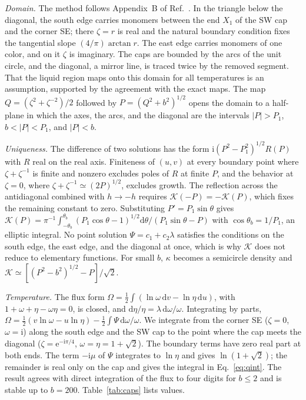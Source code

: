 \documentclass[reprint,aps,prb,floatfix,longbibliography,amsmath,amssymb]{revtex4-2}
\newcommand{\dd}{\mathrm{d}}
\newcommand{\ii}{\mathrm{i}}
\newcommand{\ee}{\mathrm{e}}
\newcommand{\cK}{\mathcal{K}}
\newcommand{\lnt}{\ln(1+\sqrt2)}
\begin{document}
\emph{Domain.} The method follows Appendix~B of Ref.~\cite{WonVacancies}. In the triangle below the diagonal, the south edge carries monomers between the end $X_1$ of the SW cap and the corner SE; there $\zeta=r$ is real and the natural boundary condition fixes the tangential slope $(4/\pi)\arctan r$. The east edge carries monomers of one color, and on it $\zeta$ is imaginary. The caps are bounded by the arcs of the unit circle, and the diagonal, a mirror line, is traced twice by the removed segment. That the liquid region maps onto this domain for all temperatures is an assumption, supported by the agreement with the exact maps. The map $Q=(\zeta^2+\zeta^{-2})/2$ followed by $P=(Q^2+b^2)^{1/2}$ opens the domain to a half-plane in which the axes, the arcs, and the diagonal are the intervals $|P|>P_1$, $b<|P|<P_1$, and $|P|<b$.

\emph{Uniqueness.} The difference of two solutions has the form $\ii(P^2-P_1^2)^{1/2}R(P)$ with $R$ real on the real axis. Finiteness of $(u,v)$ at every boundary point where $\zeta+\zeta^{-1}$ is finite and nonzero excludes poles of $R$ at finite $P$, and the behavior at $\zeta=0$, where $\zeta+\zeta^{-1}\simeq(2P)^{1/2}$, excludes growth. The reflection across the antidiagonal combined with $h\to-h$ requires $\cK(-P)=-\cK(P)$, which fixes the remaining constant to zero. Substituting $P'=P_1\sin\theta$ gives $\cK(P)=\pi^{-1}\int_{-\theta_b}^{\theta_b}(P_1\cos\theta-1)^{1/2}\dd\theta/(P_1\sin\theta-P)$ with $\cos\theta_b=1/P_1$, an elliptic integral. No point solution $\Psi=c_1+c_2\lambda$ satisfies the conditions on the south edge, the east edge, and the diagonal at once, which is why $\cK$ does not reduce to elementary functions. For small $b$, $\kappa$ becomes a semicircle density and $\cK\simeq[(P^2-b^2)^{1/2}-P]/\sqrt2$.

\emph{Temperature.} The flux form $\Omega=\frac12\int(\ln\omega\,\dd v-\ln\eta\,\dd u)$, with $1+\omega+\eta-\omega\eta=0$, is closed, and $\dd\eta/\eta=\lambda\,\dd\omega/\omega$. Integrating by parts, $\Omega=\frac12(v\ln\omega-u\ln\eta)-\frac12\int\Psi\,\dd\omega/\omega$. We integrate from the corner SE ($\zeta=0$, $\omega=\ii$) along the south edge and the SW cap to the point where the cap meets the diagonal ($\zeta=\ee^{-\ii\pi/4}$, $\omega=\eta=1+\sqrt2$). The boundary terms have zero real part at both ends. The term $-\ii\mu$ of $\Psi$ integrates to $\ln\eta$ and gives $\lnt$; the remainder is real only on the cap and gives the integral in Eq.~\eqref{eq:qint}. The result agrees with direct integration of the flux to four digits for $b\le2$ and is stable up to $b=200$. Table~\ref{tab:caps} lists values.
\end{document}
